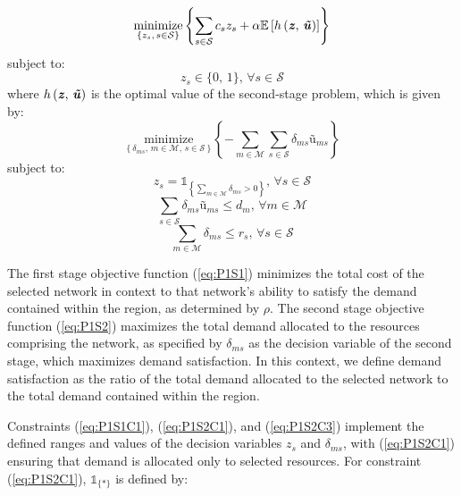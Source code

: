 \documentclass[onecolumn,draftcls]{IEEEtran}
\begin{document}

\begin{equation} \label{eq:P1S1}
\underset{\left\{z_s,\, s \in \mathcal{S}\right\}}{\text{minimize}} \left\{ \sum_{s \in \mathcal{S}} c_s z_s + \alpha \mathbb{E}\left[ h\left( \textbf{\textit{z}},\, \textbf{\textit{\~u}} \right) \right] \right\}
\end{equation}
subject to:
\begin{equation} \label{eq:P1S1C1}
z_s \in \{0,\, 1\},\, \forall s \in \mathcal{S}
\end{equation}
where $h\left( \textbf{\textit{z}},\, \textbf{\textit{\~u}} \right)$ is the optimal value of the second-stage problem, which is given by:
\begin{equation} \label{eq:P1S2}
\underset{\left\{\delta_{ms},\, m \in \mathcal{M},\, s \in \mathcal{S} \right\}}{\text{minimize}} \left\{ - \sum_{m \in \mathcal{M}} \sum_{s \in \mathcal{S}} \delta_{ms} \textit{\~u}_{ms} \right\}
\end{equation}
subject to:
\begin{equation} \label{eq:P1S2C1}
z_s = \mathbb{1}_{\left\{\sum_{m \in \mathcal{M}} \delta_{ms} > 0 \right\}},\, \forall s \in \mathcal{S}
\end{equation}
\begin{equation} \label{eq:P1S2C2}
\sum_{s \in \mathcal{S}} \delta_{ms} \textit{\~u}_{ms} \leq d_m,\, \forall m \in \mathcal{M}
\end{equation}
\begin{equation} \label{eq:P1S2C3}
\sum_{m \in \mathcal{M}} \delta_{ms} \leq r_s,\, \forall s \in \mathcal{S}
\end{equation}
\fi

The first stage objective function (\ref{eq:P1S1}) minimizes the total cost of the selected network in context to that network's ability to satisfy the demand contained within the region, as determined by $\rho$.  The second stage objective function (\ref{eq:P1S2}) maximizes the total demand allocated to the resources comprising the network, as specified by $\delta_{ms}$ as the decision variable of the second stage, which maximizes demand satisfaction.  In this context, we define demand satisfaction as the ratio of the total demand allocated to the selected network to the total demand contained within the region.

Constraints (\ref{eq:P1S1C1}), (\ref{eq:P1S2C1}), and (\ref{eq:P1S2C3}) implement the defined ranges and values of the decision variables $z_s$ and $\delta_{ms}$, with (\ref{eq:P1S2C1}) ensuring that demand is allocated only to selected resources.  For constraint (\ref{eq:P1S2C1}), $\mathbb{1}_{\{*\}}$ is defined by:
\end{document}
